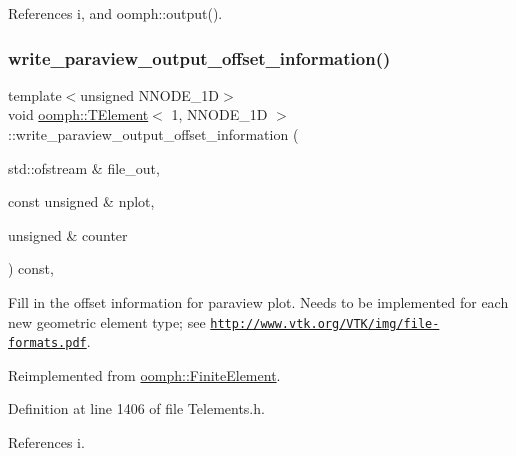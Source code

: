 References i, and oomph\+::output().

\mbox{\label{classoomph_1_1TElement_3_011_00_01NNODE__1D_01_4_a7743fd9a322362979bd1b99a1a61d6b3}} 
\subsubsection{\texorpdfstring{write\+\_\+paraview\+\_\+output\+\_\+offset\+\_\+information()}{write\_paraview\_output\_offset\_information()}}
{\footnotesize\ttfamily template$<$unsigned N\+N\+O\+D\+E\+\_\+1D$>$ \\
void \hyperlink{classoomph_1_1TElement}{oomph\+::\+T\+Element}$<$ 1, N\+N\+O\+D\+E\+\_\+1D $>$\+::write\+\_\+paraview\+\_\+output\+\_\+offset\+\_\+information (\begin{DoxyParamCaption}\item[{std\+::ofstream \&}]{file\+\_\+out,  }\item[{const unsigned \&}]{nplot,  }\item[{unsigned \&}]{counter }\end{DoxyParamCaption}) const\hspace{0.3cm}{\ttfamily [inline]}, {\ttfamily [virtual]}}



Fill in the offset information for paraview plot. Needs to be implemented for each new geometric element type; see \href{http://www.vtk.org/VTK/img/file-formats.pdf}{\tt http\+://www.\+vtk.\+org/\+V\+T\+K/img/file-\/formats.\+pdf}. 



Reimplemented from \hyperlink{classoomph_1_1FiniteElement_afed006dd5b9ab6bd613d8496e6048abf}{oomph\+::\+Finite\+Element}.



Definition at line 1406 of file Telements.\+h.



References i.

\mbox{\label{classoomph_1_1TElement_3_011_00_01NNODE__1D_01_4_a5d269eb451b774f82543eec67c9432c3}} 
